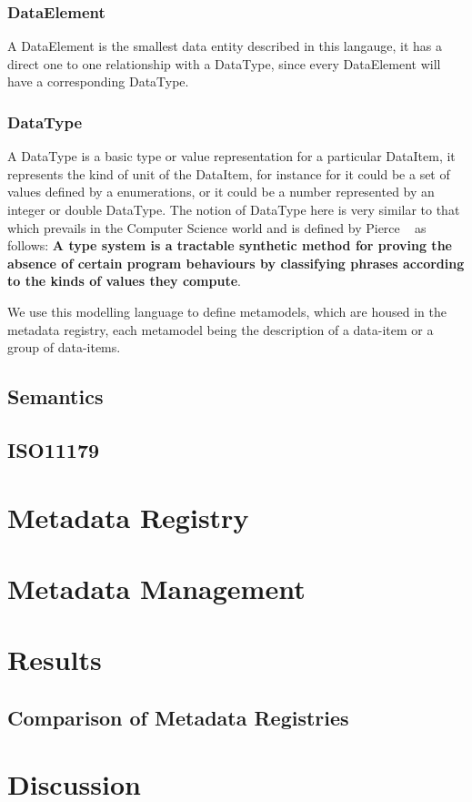 \documentclass{llncs}
\begin{document}
 \subsubsection{DataElement}
 A DataElement is the smallest data entity described in this langauge, it has a direct one to one relationship with a DataType, since every DataElement will have a corresponding DataType. 
 
 \subsubsection{DataType}
 A DataType is a basic type or value representation for a particular DataItem, it represents the kind of unit of the DataItem, for instance for it could be a set of values defined by a enumerations, or it could be a number represented by an integer or double DataType. The notion of DataType here is very similar to that which prevails in the Computer Science world and is defined by Pierce ~\cite{Pierce} as follows:
\textbf{A type system is a tractable synthetic method for proving the absence of certain program behaviours by classifying phrases according to the kinds of values they compute}. 

We use this modelling language to define metamodels, which are housed in the metadata registry, each metamodel being the description of a data-item or a group of data-items.




\subsection{Semantics}


\subsection{ISO11179}



\section{Metadata Registry}

\subsection{}


\section{Metadata Management}



\section{Results}

\subsection{Comparison of Metadata Registries}


\section{Discussion}

 


\newpage




\end{document}
